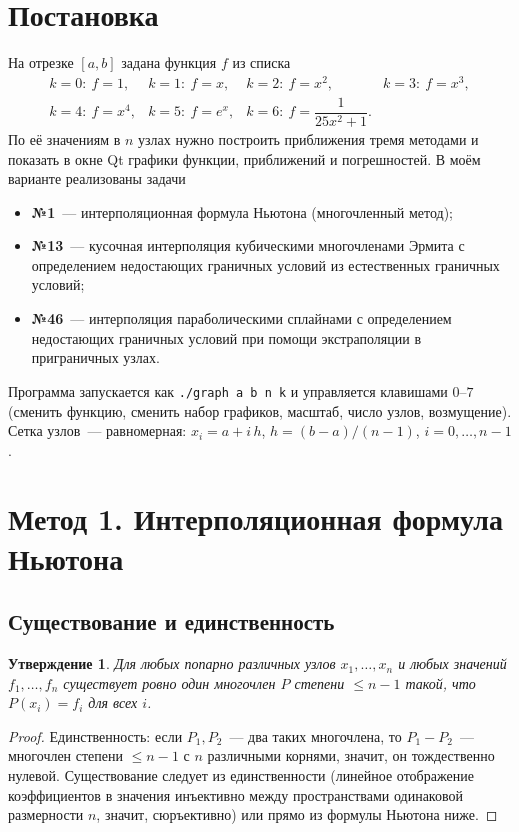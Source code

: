 \documentclass[11pt,a4paper]{report}
\newtheorem{utv}{Утверждение}[chapter]
\begin{document}
\section{Постановка}

На отрезке $[a,b]$ задана функция $f$ из списка
\[
\begin{array}{llll}
k=0:\ f=1, & k=1:\ f=x, & k=2:\ f=x^2, & k=3:\ f=x^3,\\[2pt]
k=4:\ f=x^4, & k=5:\ f=e^{x}, & k=6:\ f=\dfrac{1}{25x^2+1}. &
\end{array}
\]
По её значениям в $n$ узлах нужно построить приближения тремя методами и
показать в окне Qt графики функции, приближений и погрешностей. В моём варианте
реализованы задачи
\begin{itemize}[nosep]
\item \textbf{№1}~--- интерполяционная формула Ньютона (многочленный метод);
\item \textbf{№13}~--- кусочная интерполяция кубическими многочленами Эрмита
с определением недостающих граничных условий из естественных граничных условий;
\item \textbf{№46}~--- интерполяция параболическими сплайнами с определением
недостающих граничных условий при помощи экстраполяции в приграничных узлах.
\end{itemize}

Программа запускается как \texttt{./graph a b n k} и управляется клавишами
$0$--$7$ (сменить функцию, сменить набор графиков, масштаб, число узлов,
возмущение). Сетка узлов~--- равномерная: $x_i=a+i\,h$, $h=(b-a)/(n-1)$,
$i=0,\dots,n-1$.

\section{Метод 1. Интерполяционная формула Ньютона}

\subsection{Существование и единственность}

\begin{utv}
Для любых попарно различных узлов $x_1,\dots,x_n$ и любых значений
$f_1,\dots,f_n$ существует ровно один многочлен $P$ степени $\le n-1$ такой,
что $P(x_i)=f_i$ для всех $i$.
\end{utv}
\begin{proof}
Единственность: если $P_1,P_2$~--- два таких многочлена, то $P_1-P_2$~---
многочлен степени $\le n-1$ с $n$ различными корнями, значит, он тождественно
нулевой. Существование следует из единственности (линейное отображение
коэффициентов в значения инъективно между пространствами одинаковой размерности
$n$, значит, сюръективно) или прямо из формулы Ньютона ниже.
\end{proof}
\end{document}
